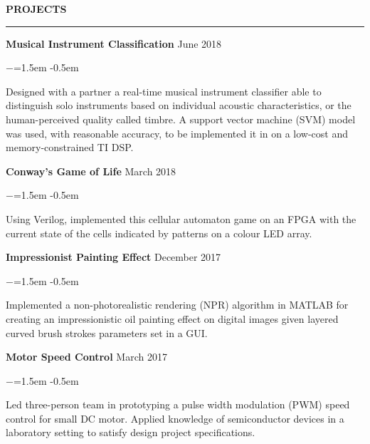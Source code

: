 \documentclass[letterpaper,11pt]{article}
\def\sectionlineskip{\smallskip} %
\def\sectionskip{\smallskip} %
\newenvironment{rSection}[1]{ %
\sectionskip
\MakeUppercase{\bf #1} %
\sectionlineskip
\hrule %
\begin{list}{}{ %
\setlength{\leftmargin}{1.5em} %
}
\item[]
}{\end{list}}
\newenvironment{rSubsection}[6]{ %
{\bf #1} \hfill {#2} \\ %
\ifthenelse{\equal{#3}{}}{}{ %
{#3} \hfill {#4} \\
}
\ifthenelse{\equal{#5}{}}{}{ %
{#5} \hfill {#6} \\
}

\begin{list}{$-$}{\leftmargin=1.5em} %
\itemsep -0.5em \vspace{-0.5em} %
\medskip
}{\end{list}}
\begin{document}
\begin{rSection}{Projects} 


\begin{rSubsection}{Musical Instrument Classification}{June 2018}{}{}{}{}  

\item Designed with a partner a real-time musical instrument classifier able to distinguish solo instruments based on individual acoustic characteristics, or the human-perceived quality called timbre. A support vector machine (SVM) model was used, with reasonable accuracy, to be implemented it in on a low-cost and memory-constrained TI DSP.

\end{rSubsection}


\begin{rSubsection}{Conway's Game of Life}{March 2018}{}{}{}{}  

\item Using Verilog, implemented this cellular automaton game on an FPGA with the current state of the cells indicated by patterns on a colour LED array.  

\end{rSubsection}


\begin{rSubsection}{Impressionist Painting Effect}{December 2017}{}{}{}{} 

\item Implemented a non-photorealistic rendering (NPR) algorithm in MATLAB for creating an impressionistic oil painting effect on digital images given layered curved brush strokes parameters set in a GUI.   

\end{rSubsection}


\begin{rSubsection}{Motor Speed Control}{March 2017}{}{}{}{} 

\item Led three-person team in prototyping a pulse width modulation (PWM) speed control for small DC motor. Applied knowledge of semiconductor devices in a laboratory setting to satisfy design project specifications.

\end{rSubsection} 

\end{rSection} 
\end{document}
